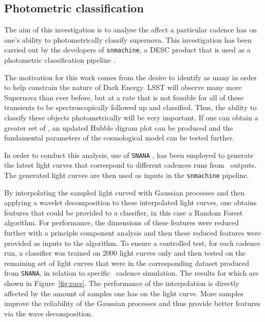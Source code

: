 \subsection{Photometric classification}


The aim of this investigation is to analyse the affect a particular cadence has
on one's ability to photometrically classify supernova. This investigation has been carried out by the
developers of {\tt snmachine}, a DESC product that is used as a photometric
classification pipeline \cite{lochner2016photometric}.

The motivation for this work comes from the desire to identify as many \sne in
order to help constrain the nature of Dark Energy.
LSST will observe many more Supernova than ever before, but at a rate that is
not feasible for all of these transients to be spectroscopically followed up and
classified. Thus, the ability to classify these objects photometrically will be very
important. If one can obtain a greater set of \sne, an updated Hubble
digram plot can be produced and the fundamental parameters of the cosmological
model can be tested further.

In order to conduct this analysis, use of
{\tt SNANA} \cite{kessler2009snana}, has been employed to generate the latest light curves that
correspond to different cadences runs from \opsim~outputs. The generated light
curves are then used as inputs in the {\tt snmachine} pipeline.

By interpolating the sampled light curved with Gaussian processes and then
applying a wavelet decomposition to these interpolated light curves, one obtains features
that could be provided to a classifier, in this case a Random Forest algorithm.
For performance, the dimensions of these features were reduced further with a principle
component analysis and then these reduced features were provided as inputs to the algorithm.
To ensure a controlled test,
for each cadence run, a classifier was trained on 2000 light
curves only and then tested on the remaining set of light curves that were in the
corresponding dataset produced from {\tt SNANA}, in relation to specific
\opsim~cadence simulation. The results for which are shown in
Figure~\ref{fig:rocs}.
The performance of the interpolation is directly affected by the amount of
samples one has on the light curve. More samples improve the reliability of the
Gaussian processes and thus provide better features via the wave
decomposition.


